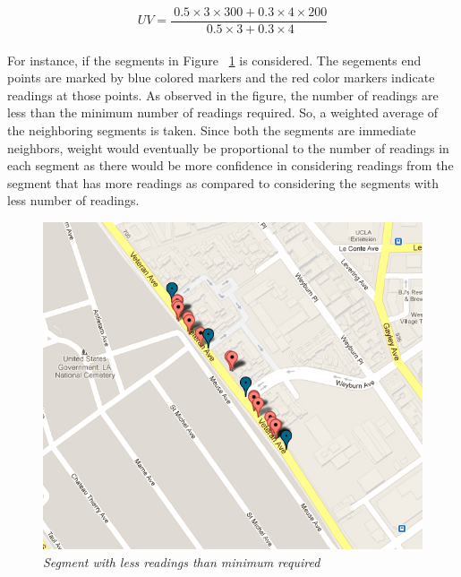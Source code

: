 \documentclass[10pt]{sigplan-proc-varsize}
\begin{document}
\begin{equation}
\label{eq1}
UV=\frac{\ 0.5 \times 3 \times 300+ 0.3 \times 4 \times 200}{\ 0.5 \times 3+0.3 \times 4}
\end{equation}\\


For instance, if the segments in Figure ~\ref{fig:lessReadings} is considered. The segements end points are marked by blue colored markers and the red color markers indicate readings at those points. As observed in the figure, the number of readings are less than the minimum number of readings required. So, a weighted average of the neighboring segments is taken. Since both the segments are immediate neighbors, weight would eventually be proportional to the number of readings in each segment as there would be more confidence in considering readings from the segment that has more readings as compared to considering the segments with less number of readings. 
\begin{figure}
\begin{center}
\includegraphics[scale=0.35]{lessReadings.png}
\caption{\small \sl Segment with less readings than minimum required}
\label{fig:lessReadings}
\end{center}
\end{figure}
\end{document}
